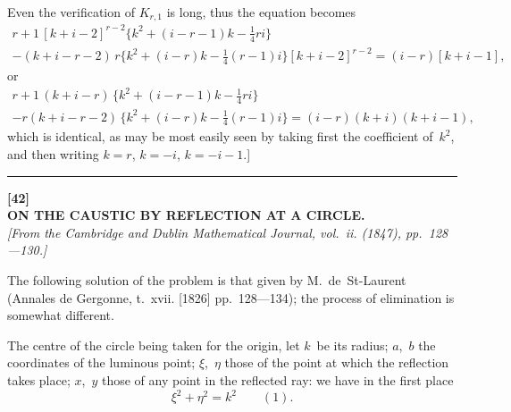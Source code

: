 \documentclass[11pt,a4paper]{article}
\begin{document}
Even the verification of $K_{r,1}$ is long, thus the equation becomes
\begin{multline*}
r+1 \, [k+i-2]^{r-2} \{k^2 + (i-r-1)k - \tfrac{1}{4}ri\} \\
- (k+i-r-2)\,r\{k^2 + (i-r)k - \tfrac{1}{4}(r-1)i\}[k+i-2]^{r-2} = (i-r)[k+i-1],
\end{multline*}
or
\begin{multline*}
r+1 \, (k+i-r)\,\{k^2 + (i-r-1)k - \tfrac{1}{4}ri\} \\
- r(k+i-r-2)\,\{k^2 + (i-r)k - \tfrac{1}{4}(r-1)i\} = (i-r)(k+i)(k+i-1),
\end{multline*}
which is identical, as may be most easily seen by taking first the coefficient of~$k^2$, and then writing $k=r$, $k=-i$, $k=-i-1$.]
\normalsize

\vspace{20pt}
\begin{center}
\rule{0.5\textwidth}{0.4pt}
\end{center}


\newpage
\begin{center}
\textbf{[42]}\\[4pt]
\textbf{\large ON THE CAUSTIC BY REFLECTION AT A CIRCLE.}\\[4pt]
\textit{[From the Cambridge and Dublin Mathematical Journal, vol.~ii. (1847), pp.~128---130.]}
\end{center}

\vspace{6pt}

The following solution of the problem is that given by M.~de~St-Laurent (Annales de Gergonne, t.~xvii. [1826] pp.~128---134); the process of elimination is somewhat different.

The centre of the circle being taken for the origin, let $k$~be its radius; $a$,~$b$ the coordinates of the luminous point; $\xi$,~$\eta$ those of the point at which the reflection takes place; $x$,~$y$ those of any point in the reflected ray: we have in the first place
\[
\xi^2 + \eta^2 = k^2 \qquad(1).
\]
\end{document}
